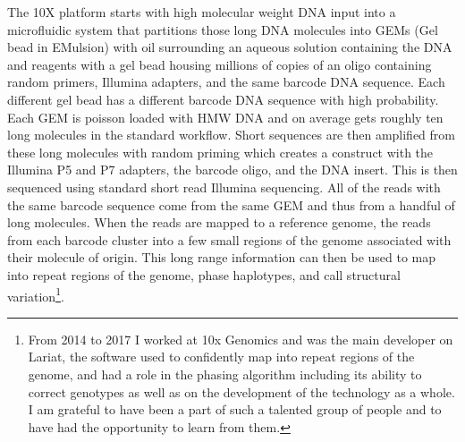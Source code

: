 \par{
The 10X platform starts with high molecular weight DNA input into a microfluidic system that partitions those long DNA molecules into GEMs (Gel bead in EMulsion) with oil surrounding an aqueous solution containing the DNA and reagents with a gel bead housing millions of copies of an oligo containing random primers, Illumina adapters, and the same barcode DNA sequence. Each different gel bead has a different barcode DNA sequence with high probability. Each GEM is poisson loaded with HMW DNA and on average gets roughly ten long molecules in the standard workflow. Short sequences are then amplified from these long molecules with random priming which creates a construct with the Illumina P5 and P7 adapters, the barcode oligo, and the DNA insert. This is then sequenced using standard short read Illumina sequencing. All of the reads with the same barcode sequence come from the same GEM and thus from a handful of long molecules. When the reads are mapped to a reference genome, the reads from each barcode cluster into a few small regions of the genome associated with their molecule of origin. This long range information can then be used to map into repeat regions of the genome, phase haplotypes, and call structural variation\cite{10xlinked}\footnote{From 2014 to 2017 I worked at 10x Genomics and was the main developer on Lariat, the software used to confidently map into repeat regions of the genome, and had a role in the phasing algorithm including its ability to correct genotypes as well as on the development of the technology as a whole. I am grateful to have been a part of such a talented group of people and to have had the opportunity to learn from them.}.
}

